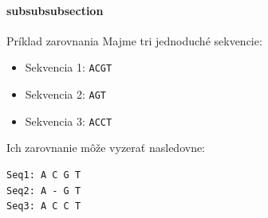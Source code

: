 \paragraph{subsubsubsection}{Príklad zarovnania}
Majme tri jednoduché sekvencie:
\begin{itemize}
    \item Sekvencia 1: \texttt{ACGT}
    \item Sekvencia 2: \texttt{AGT}
    \item Sekvencia 3: \texttt{ACCT}
\end{itemize}

Ich zarovnanie môže vyzerať nasledovne:

\begin{verbatim}
Seq1: A C G T
Seq2: A - G T
Seq3: A C C T
\end{verbatim}
